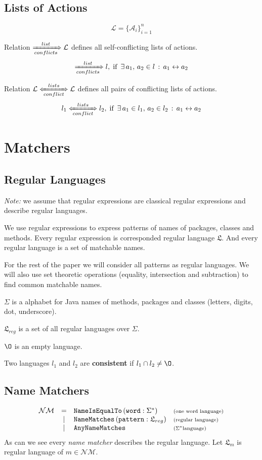 \documentclass{article}
\newcommand{\cActions}{\leftrightarrow}
\newcommand{\cList}{\xRightarrow[conflicts]{list}}
\newcommand{\cLists}{\xLeftrightarrow[conflict]{lists}}
\newcommand{\lang}{\mathfrak{L}}
\newcommand{\regL}{\lang_{reg}}
\newcommand{\fullL}{$\Sigma^*$}
\newcommand{\descr}[1]{\mbox{\scriptsize ({#1})}}
\begin{document}
\subsection{Lists of Actions}

\[\mathcal{L} = \{\mathcal{A}_i\}_{i=1}^{n}\]

\noindent Relation $\cList \mathcal{L}$ defines all self-conflicting lists of actions.
\[
\cList l,\; \mbox{if }\, \exists\, a_1,\, a_2 \in l\, : \, a_1 \cActions a_2
\]

\noindent Relation $\mathcal{L} \cLists \mathcal{L}$ defines all pairs of conflicting lists of actions.
\[
l_1 \cLists l_2,\; \mbox{if }\, \exists\, a_1 \in l_1,\, a_2 \in l_2\, : \, a_1 \cActions a_2
\]


\section{Matchers}
\subsection{Regular Languages}

\textit{Note:} we assume that regular expressions are classical regular expressions and describe regular languages.

We use regular expressions to express patterns of names of packages, classes and methods. Every regular expression is corresponded regular language $\lang$. And every regular language is a set of matchable names.

For the rest of the paper we will consider all patterns as regular languages. We will also use set theoretic operations (equality, intersection and subtraction) to find common matchable names.

$\Sigma$ is a alphabet for Java names of methods, packages and classes (letters, digits, dot, underscore).

$\regL$ is a set of all regular languages over $\Sigma$.

$\O$ is an empty language.

Two languages $l_1$ and $l_2$ are \textbf{consistent} if $l_1 \cap l_2 \not= \O$.

\subsection{Name Matchers}

\[
\begin{array}{rcll}
\mathcal{NM} & =    & \texttt{NameIsEqualTo}\,(\texttt{word} : \Sigma^*) & \descr{one word language} \\
             & \mid & \texttt{NameMatches}\,(\texttt{pattern} : \regL) & \descr{regular language} \\
             & \mid & \texttt{AnyNameMatches} & \descr{\fullL language}
\end{array}
\]
\noindent As can we see every \textit{name matcher} describes the regular language. Let $\lang_m$ is regular language of $m \in \mathcal{NM}$.
\end{document}
